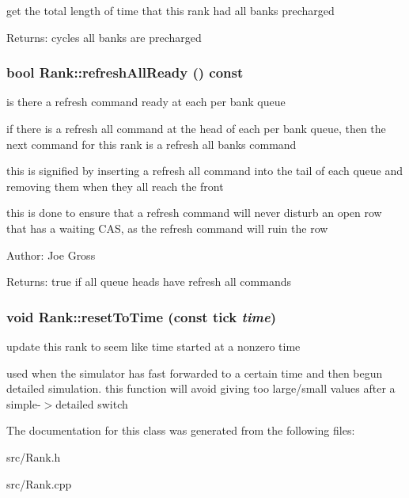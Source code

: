 get the total length of time that this rank had all banks precharged 

\begin{Desc}
\item[Returns:]cycles all banks are precharged \end{Desc}
\subsubsection[{refreshAllReady}]{\setlength{\rightskip}{0pt plus 5cm}bool Rank::refreshAllReady () const}\label{class_d_r_a_msim_i_i_1_1_rank_4d4cff8cd255d95b088a6d70cc07570d}


is there a refresh command ready at each per bank queue 

if there is a refresh all command at the head of each per bank queue, then the next command for this rank is a refresh all banks command\par
 this is signified by inserting a refresh all command into the tail of each queue and removing them when they all reach the front\par
 this is done to ensure that a refresh command will never disturb an open row that has a waiting CAS, as the refresh command will ruin the row \begin{Desc}
\item[Author:]Joe Gross \end{Desc}
\begin{Desc}
\item[Returns:]true if all queue heads have refresh all commands \end{Desc}
\subsubsection[{resetToTime}]{\setlength{\rightskip}{0pt plus 5cm}void Rank::resetToTime (const tick {\em time})}\label{class_d_r_a_msim_i_i_1_1_rank_a9de29dd0e1e1acc4d13f4232ab59088}


update this rank to seem like time started at a nonzero time 

used when the simulator has fast forwarded to a certain time and then begun detailed simulation. this function will avoid giving too large/small values after a simple-$>$detailed switch 

The documentation for this class was generated from the following files:\begin{CompactItemize}
\item 
src/Rank.h\item 
src/Rank.cpp\end{CompactItemize}
